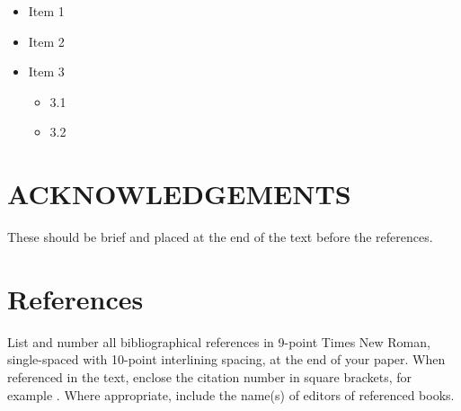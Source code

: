 \documentclass[11pt]{scrartcl}
\begin{document}
\begin{itemize}
	\item Item 1
	\item Item 2
	\item Item 3
	\begin{itemize}
		\item 3.1
		\item 3.2
	\end{itemize}
\end{itemize}

\section{ACKNOWLEDGEMENTS}

These should be brief and placed at the end of the text before the references.

\section{References}

\fontsize{9}{10pt}


List and number all bibliographical references in 9-point Times New Roman, single-spaced with 10-point interlining spacing, at the end of your paper. When referenced in the text, enclose the citation number in square brackets, for example \cite{1}. Where appropriate, include the name(s) of editors of referenced books.


\end{document}
